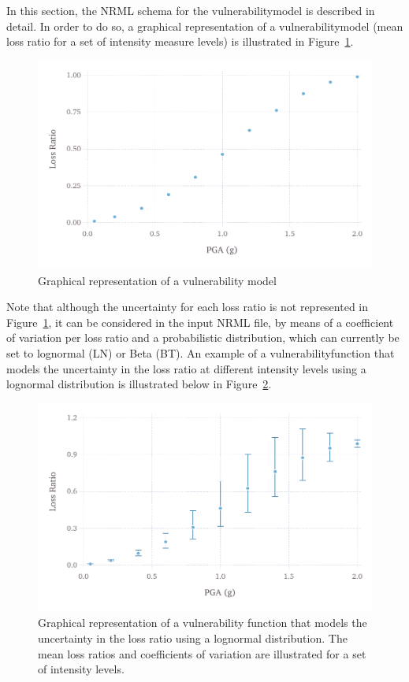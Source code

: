 In this section, the NRML schema for the \gls{vulnerabilitymodel} is
described in detail. In order to do so, a graphical representation of a
\gls{vulnerabilitymodel} (mean loss ratio for a set of intensity measure
levels) is illustrated in Figure~\ref{fig:vulnerability-zero-cov}.

\begin{figure}[ht]
\centering
\includegraphics[width=12cm]{figures/risk/vulnerability-zero-cov.pdf}
\caption{Graphical representation of a vulnerability model}
\label{fig:vulnerability-zero-cov}
\end{figure}

Note that although the uncertainty for each loss ratio is not represented in
Figure~\ref{fig:vulnerability-zero-cov}, it can be considered in the input
NRML file, by means of a coefficient of variation per loss ratio and a
probabilistic distribution, which can currently be set to lognormal (LN) or
Beta (BT). An example of a \gls{vulnerabilityfunction} that models the 
uncertainty in the loss ratio at different intensity levels using a lognormal
distribution is illustrated below in Figure~\ref{fig:vulnerability-nonzero-cov}.

\begin{figure}[ht]
\centering
\includegraphics[width=12cm]{figures/risk/vulnerability-nonzero-cov.pdf}
\caption{Graphical representation of a vulnerability function that models the uncertainty in the loss ratio using a lognormal distribution. The mean loss ratios and coefficients of variation are illustrated for a set of intensity levels.}
\label{fig:vulnerability-nonzero-cov}
\end{figure}


